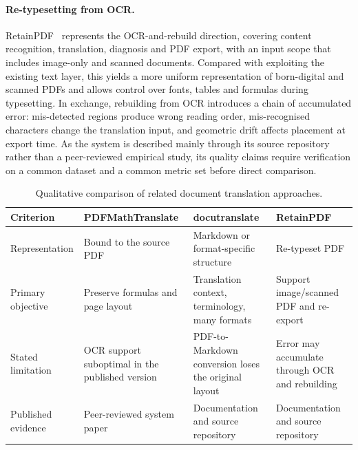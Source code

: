 \paragraph{Re-typesetting from OCR.} RetainPDF~\citep{retain-pdf} represents the
OCR-and-rebuild direction, covering content recognition, translation, diagnosis
and PDF export, with an input scope that includes image-only and scanned
documents. Compared with exploiting the existing text layer, this yields a more
uniform representation of born-digital and scanned PDFs and allows control over
fonts, tables and formulas during typesetting. In exchange, rebuilding from OCR
introduces a chain of accumulated error: mis-detected regions produce wrong
reading order, mis-recognised characters change the translation input, and
geometric drift affects placement at export time. As the system is described
mainly through its source repository rather than a peer-reviewed empirical
study, its quality claims require verification on a common dataset and a common
metric set before direct comparison.


\begin{table}[H]
    \centering
    \caption{Qualitative comparison of related document translation approaches.}
    \label{tab:related-work-comparison}
    \footnotesize
    \begin{tabularx}{\textwidth}{@{}
        >{\raggedright\arraybackslash}p{2.3cm}
        >{\raggedright\arraybackslash}X
        >{\raggedright\arraybackslash}X
        >{\raggedright\arraybackslash}X@{}}
        \toprule
        \textbf{Criterion} & \textbf{PDFMathTranslate} & \textbf{docutranslate} & \textbf{RetainPDF} \\
        \midrule
        Representation
        & Bound to the source PDF
        & Markdown or format-specific structure
        & Re-typeset PDF \\
        Primary objective
        & Preserve formulas and page layout
        & Translation context, terminology, many formats
        & Support image/scanned PDF and re-export \\
        Stated limitation
        & OCR support suboptimal in the published version
        & PDF-to-Markdown conversion loses the original layout
        & Error may accumulate through OCR and rebuilding \\
        Published evidence
        & Peer-reviewed system paper
        & Documentation and source repository
        & Documentation and source repository \\
        \bottomrule
    \end{tabularx}
\end{table}

